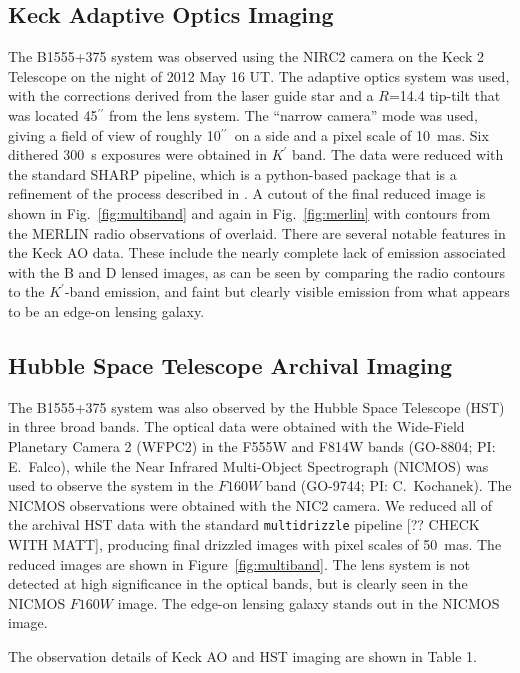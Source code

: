\documentclass[useAMS,usenatbib]{mn2e}
\begin{document}
\subsection{Keck Adaptive Optics Imaging}

The B1555+375 system was observed using the NIRC2 camera on the Keck 2
Telescope on the night of 2012 May 16 UT.  The adaptive optics system
was used, with the corrections derived from the laser guide star and a
$R$=14.4 tip-tilt that was located 45$^{\prime\prime}$ from the lens
system.  The ``narrow camera'' mode was used, giving a field of view
of roughly 10$^{\prime\prime}$\ on a side and a pixel scale of 10~mas.
Six dithered 300~s exposures were obtained in $K^{\prime}$ band.  The
data were reduced with the standard SHARP pipeline, which is a
python-based package that is a refinement of the process described in
\citet{Auger_EELS1}.  A cutout of the final reduced image is shown in
Fig.~\ref{fig:multiband} and again in Fig.~\ref{fig:merlin} with
contours from the MERLIN radio observations of \citet{Marlow99}
overlaid.  There are several notable features in the Keck AO data.
These include the nearly complete lack of emission associated with the
B and D lensed images, as can be seen by comparing the radio contours
to the $K^\prime$-band emission, and faint but clearly visible
emission from what appears to be an edge-on lensing galaxy.

\subsection{Hubble Space Telescope Archival Imaging}

The B1555+375 system was also observed by the Hubble Space Telescope
(HST) in three broad bands.  The optical data were obtained with the
Wide-Field Planetary Camera 2 (WFPC2) in the F555W and F814W bands
(GO-8804; PI: E.\ Falco), while the Near Infrared Multi-Object
Spectrograph (NICMOS) was used to observe the system in the $F160W$
band (GO-9744; PI: C.\ Kochanek).  The NICMOS observations were
obtained with the NIC2 camera.  We reduced all of the archival HST
data with the standard {\tt multidrizzle} pipeline [?? CHECK WITH
  MATT], producing final drizzled images with pixel scales of 50~mas.
The reduced images are shown in Figure~\ref{fig:multiband}.  The lens
system is not detected at high significance in the optical bands, but
is clearly seen in the NICMOS $F160W$ image.  The edge-on lensing
galaxy stands out in the NICMOS image.

The observation details of Keck AO and HST imaging are shown in Table 1.
\end{document}
